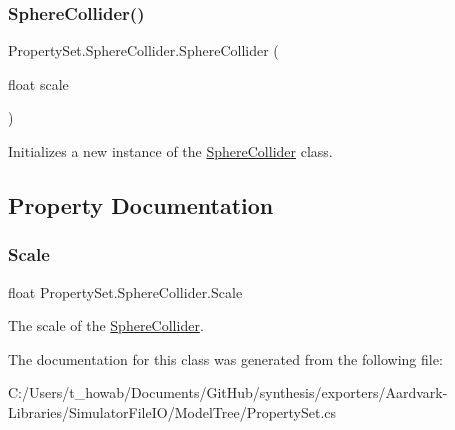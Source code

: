 \subsubsection{\texorpdfstring{Sphere\+Collider()}{SphereCollider()}}
{\footnotesize\ttfamily Property\+Set.\+Sphere\+Collider.\+Sphere\+Collider (\begin{DoxyParamCaption}\item[{float}]{scale }\end{DoxyParamCaption})}



Initializes a new instance of the \hyperlink{class_property_set_1_1_sphere_collider}{Sphere\+Collider} class. 



\subsection{Property Documentation}
\mbox{\label{class_property_set_1_1_sphere_collider_a1dbdd1e192db29b1a749679473cb4e5d}} 
\subsubsection{\texorpdfstring{Scale}{Scale}}
{\footnotesize\ttfamily float Property\+Set.\+Sphere\+Collider.\+Scale\hspace{0.3cm}{\ttfamily [get]}}



The scale of the \hyperlink{class_property_set_1_1_sphere_collider}{Sphere\+Collider}. 



The documentation for this class was generated from the following file\+:\begin{DoxyCompactItemize}
\item 
C\+:/\+Users/t\+\_\+howab/\+Documents/\+Git\+Hub/synthesis/exporters/\+Aardvark-\/\+Libraries/\+Simulator\+File\+I\+O/\+Model\+Tree/Property\+Set.\+cs\end{DoxyCompactItemize}
